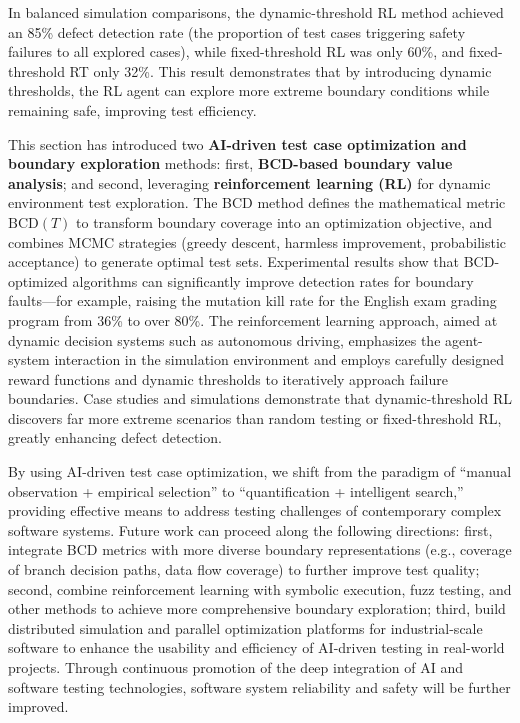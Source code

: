 \documentclass[manuscript,screen,review]{acmart}
\begin{document}
In balanced simulation comparisons, the dynamic-threshold RL method achieved an 85\% defect detection rate (the proportion of test cases triggering safety failures to all explored cases), while fixed-threshold RL was only 60\%, and fixed-threshold RT only 32\%. This result demonstrates that by introducing dynamic thresholds, the RL agent can explore more extreme boundary conditions while remaining safe, improving test efficiency.

This section has introduced two \textbf{AI-driven test case optimization and boundary exploration} methods: first, \textbf{BCD-based boundary value analysis}; and second, leveraging \textbf{reinforcement learning (RL)} for dynamic environment test exploration. The BCD method defines the mathematical metric $\mathrm{BCD}(T)$ to transform boundary coverage into an optimization objective, and combines MCMC strategies (greedy descent, harmless improvement, probabilistic acceptance) to generate optimal test sets. Experimental results show that BCD-optimized algorithms can significantly improve detection rates for boundary faults---for example, raising the mutation kill rate for the English exam grading program from 36\% to over 80\%. The reinforcement learning approach, aimed at dynamic decision systems such as autonomous driving, emphasizes the agent-system interaction in the simulation environment and employs carefully designed reward functions and dynamic thresholds to iteratively approach failure boundaries. Case studies and simulations demonstrate that dynamic-threshold RL discovers far more extreme scenarios than random testing or fixed-threshold RL, greatly enhancing defect detection.

By using AI-driven test case optimization, we shift from the paradigm of ``manual observation + empirical selection'' to ``quantification + intelligent search,'' providing effective means to address testing challenges of contemporary complex software systems. Future work can proceed along the following directions: first, integrate BCD metrics with more diverse boundary representations (e.g., coverage of branch decision paths, data flow coverage) to further improve test quality; second, combine reinforcement learning with symbolic execution, fuzz testing, and other methods to achieve more comprehensive boundary exploration; third, build distributed simulation and parallel optimization platforms for industrial-scale software to enhance the usability and efficiency of AI-driven testing in real-world projects. Through continuous promotion of the deep integration of AI and software testing technologies, software system reliability and safety will be further improved.
\end{document}
